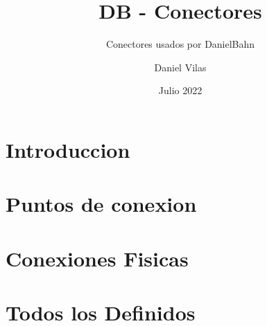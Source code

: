 \documentclass[spanish]{DccDiyTools/DccDiyTools}
\title{DB - Conectores}
\subtitle{Conectores usados por DanielBahn}
\author{Daniel Vilas}
\date{Julio 2022}
\begin{document}
\maketitle
\newpage
\section{Introduccion}

\newpage
\section{Puntos de conexion}


\newpage
\section{Conexiones Fisicas}

\newpage
\section{Todos los Definidos}

\end{document}
